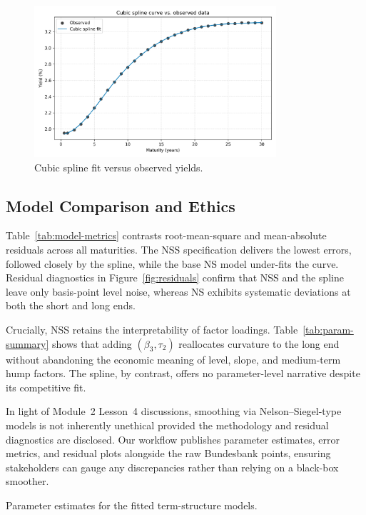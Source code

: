 \documentclass[12pt]{article}
\begin{document}
\begin{figure}[htbp]
  \centering
  \includegraphics[width=0.8\textwidth]{../data/output/figure_spline_fit.png}
  \caption{Cubic spline fit versus observed yields.}
  \label{fig:spline-fit}
\end{figure}

\FloatBarrier
\subsection{Model Comparison and Ethics}
\begin{spacing}{1.15}
Table~\ref{tab:model-metrics} contrasts root-mean-square and mean-absolute residuals across all maturities. The NSS specification delivers the lowest errors, followed closely by the spline, while the base NS model under-fits the curve. Residual diagnostics in Figure~\ref{fig:residuals} confirm that NSS and the spline leave only basis-point level noise, whereas NS exhibits systematic deviations at both the short and long ends.

Crucially, NSS retains the interpretability of factor loadings. Table~\ref{tab:param-summary} shows that adding $(\beta_3, \tau_2)$ reallocates curvature to the long end without abandoning the economic meaning of level, slope, and medium-term hump factors. The spline, by contrast, offers no parameter-level narrative despite its competitive fit.

In light of Module~2 Lesson~4 discussions, smoothing via Nelson--Siegel-type models is not inherently unethical provided the methodology and residual diagnostics are disclosed. Our workflow publishes parameter estimates, error metrics, and residual plots alongside the raw Bundesbank points, ensuring stakeholders can gauge any discrepancies rather than relying on a black-box smoother.
\end{spacing}

\begin{table}[htbp]
  \centering
  \caption{Parameter estimates for the fitted term-structure models.}
  \label{tab:param-summary}
  
\end{table}
\end{document}
